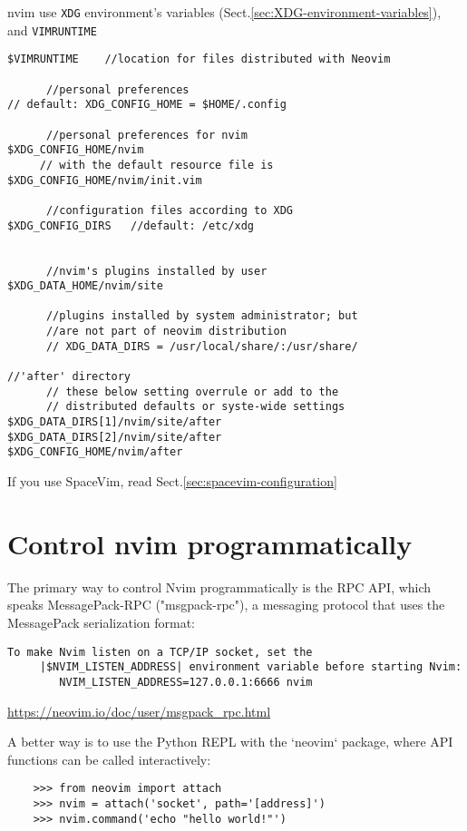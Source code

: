 nvim use \verb!XDG! environment's variables
(Sect.\ref{sec:XDG-environment-variables}), and \verb!VIMRUNTIME!
\begin{verbatim}
$VIMRUNTIME    //location for files distributed with Neovim

      //personal preferences
// default: XDG_CONFIG_HOME = $HOME/.config
      
      //personal preferences for nvim
$XDG_CONFIG_HOME/nvim
     // with the default resource file is
$XDG_CONFIG_HOME/nvim/init.vim

      //configuration files according to XDG
$XDG_CONFIG_DIRS   //default: /etc/xdg


      //nvim's plugins installed by user
$XDG_DATA_HOME/nvim/site

      //plugins installed by system administrator; but
      //are not part of neovim distribution
      // XDG_DATA_DIRS = /usr/local/share/:/usr/share/
      
//'after' directory
      // these below setting overrule or add to the 
      // distributed defaults or syste-wide settings
$XDG_DATA_DIRS[1]/nvim/site/after
$XDG_DATA_DIRS[2]/nvim/site/after
$XDG_CONFIG_HOME/nvim/after
\end{verbatim}

If you use SpaceVim, read Sect.\ref{sec:spacevim-configuration}

\section{Control nvim programmatically}


The primary way to control Nvim programmatically is the RPC API, which speaks
MessagePack-RPC ("msgpack-rpc"), a messaging protocol that uses the
MessagePack serialization format:

\begin{verbatim}
To make Nvim listen on a TCP/IP socket, set the
     |$NVIM_LISTEN_ADDRESS| environment variable before starting Nvim:
        NVIM_LISTEN_ADDRESS=127.0.0.1:6666 nvim
\end{verbatim}
\url{https://neovim.io/doc/user/msgpack_rpc.html}

A better way is to use the Python REPL with the `neovim` package, where API
functions can be called interactively:
\begin{verbatim}
    >>> from neovim import attach
    >>> nvim = attach('socket', path='[address]')
    >>> nvim.command('echo "hello world!"')
\end{verbatim}



